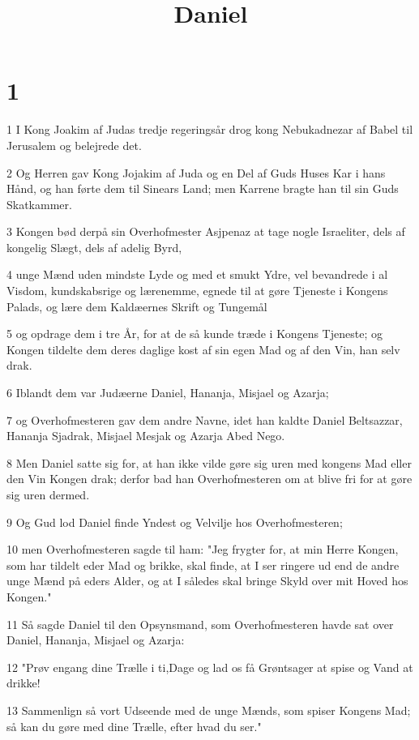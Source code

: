 

\title{Daniel}


\chapter{1}

\par 1 I Kong Joakim af Judas tredje regeringsår drog kong Nebukadnezar af Babel til Jerusalem og belejrede det.
\par 2 Og Herren gav Kong Jojakim af Juda og en Del af Guds Huses Kar i hans Hånd, og han førte dem til Sinears Land; men Karrene bragte han til sin Guds Skatkammer.
\par 3 Kongen bød derpå sin Overhofmester Asjpenaz at tage nogle Israeliter, dels af kongelig Slægt, dels af adelig Byrd,
\par 4 unge Mænd uden mindste Lyde og med et smukt Ydre, vel bevandrede i al Visdom, kundskabsrige og lærenemme, egnede til at gøre Tjeneste i Kongens Palads, og lære dem Kaldæernes Skrift og Tungemål
\par 5 og opdrage dem i tre År, for at de så kunde træde i Kongens Tjeneste; og Kongen tildelte dem deres daglige kost af sin egen Mad og af den Vin, han selv drak.
\par 6 Iblandt dem var Judæerne Daniel, Hananja, Misjael og Azarja;
\par 7 og Overhofmesteren gav dem andre Navne, idet han kaldte Daniel Beltsazzar, Hananja Sjadrak, Misjael Mesjak og Azarja Abed Nego.
\par 8 Men Daniel satte sig for, at han ikke vilde gøre sig uren med kongens Mad eller den Vin Kongen drak; derfor bad han Overhofmesteren om at blive fri for at gøre sig uren dermed.
\par 9 Og Gud lod Daniel finde Yndest og Velvilje hos Overhofmesteren;
\par 10 men Overhofmesteren sagde til ham: "Jeg frygter for, at min Herre Kongen, som har tildelt eder Mad og brikke, skal finde, at I ser ringere ud end de andre unge Mænd på eders Alder, og at I således skal bringe Skyld over mit Hoved hos Kongen."
\par 11 Så sagde Daniel til den Opsynsmand, som Overhofmesteren havde sat over Daniel, Hananja, Misjael og Azarja:
\par 12 "Prøv engang dine Trælle i ti,Dage og lad os få Grøntsager at spise og Vand at drikke!
\par 13 Sammenlign så vort Udseende med de unge Mænds, som spiser Kongens Mad; så kan du gøre med dine Trælle, efter hvad du ser."
